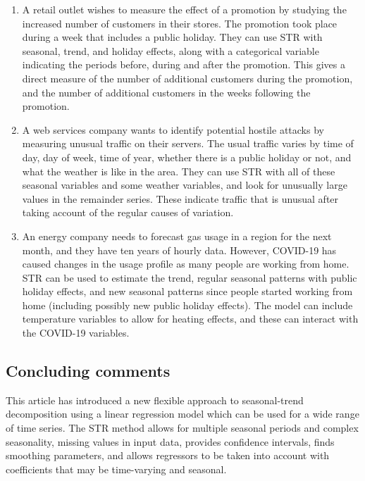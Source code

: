\documentclass[ijds,nonblindrev]{informs-ijds}
\providecommand{\tightlist}{%
  \setlength{\itemsep}{0pt}\setlength{\parskip}{0pt}}
\begin{document}
\begin{enumerate}
\def\labelenumi{\arabic{enumi}.}
\tightlist
\item
  A retail outlet wishes to measure the effect of a promotion by studying the increased number of customers in their stores. The promotion took place during a week that includes a public holiday. They can use STR with seasonal, trend, and holiday effects, along with a categorical variable indicating the periods before, during and after the promotion. This gives a direct measure of the number of additional customers during the promotion, and the number of additional customers in the weeks following the promotion.
\item
  A web services company wants to identify potential hostile attacks by measuring unusual traffic on their servers. The usual traffic varies by time of day, day of week, time of year, whether there is a public holiday or not, and what the weather is like in the area. They can use STR with all of these seasonal variables and some weather variables, and look for unusually large values in the remainder series. These indicate traffic that is unusual after taking account of the regular causes of variation.
\item
  An energy company needs to forecast gas usage in a region for the next month, and they have ten years of hourly data. However, COVID-19 has caused changes in the usage profile as many people are working from home. STR can be used to estimate the trend, regular seasonal patterns with public holiday effects, and new seasonal patterns since people started working from home (including possibly new public holiday effects). The model can include temperature variables to allow for heating effects, and these can interact with the COVID-19 variables.
\end{enumerate}

\hypertarget{concluding-comments}{%
\subsection{Concluding comments}\label{concluding-comments}}

This article has introduced a new flexible approach to seasonal-trend decomposition using a linear regression model which can be used for a wide range of time series. The STR method allows for multiple seasonal periods and complex seasonality, missing values in input data, provides confidence intervals, finds smoothing parameters, and allows regressors to be taken into account with coefficients that may be time-varying and seasonal.
\end{document}
